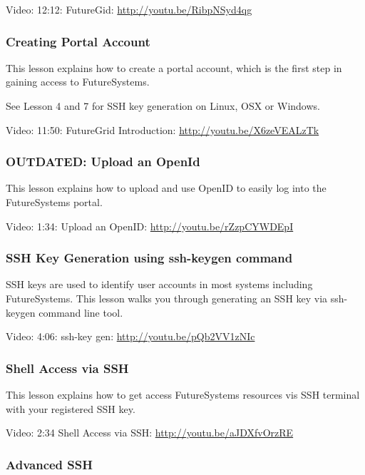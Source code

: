 Video: 12:12: FutureGid: \url{http://youtu.be/RibpNSyd4qg}

\subsubsection{Creating Portal Account}\label{creating-portal-account}

This lesson explains how to create a portal account, which is the first
step in gaining access to FutureSystems.

See Lesson 4 and 7 for SSH key generation on Linux, OSX or Windows.

Video: 11:50: FutureGrid Introduction: \url{http://youtu.be/X6zeVEALzTk}

\subsubsection{OUTDATED: Upload an
OpenId}\label{outdated-upload-an-openid}

This lesson explains how to upload and use OpenID to easily log into the
FutureSystems portal.

Video: 1:34: Upload an OpenID: \url{http://youtu.be/rZzpCYWDEpI}

\subsubsection{SSH Key Generation using ssh-keygen
command}\label{ssh-key-generation-using-ssh-keygen-command}

SSH keys are used to identify user accounts in most systems including
FutureSystems. This lesson walks you through generating an SSH key via
ssh-keygen command line tool.

Video: 4:06: ssh-key gen: \url{http://youtu.be/pQb2VV1zNIc}

\subsubsection{Shell Access via SSH}\label{shell-access-via-ssh}

This lesson explains how to get access FutureSystems resources vis SSH
terminal with your registered SSH key.

Video: 2:34 Shell Access via SSH: \url{http://youtu.be/aJDXfvOrzRE}

\subsubsection{Advanced SSH}\label{advanced-ssh}

